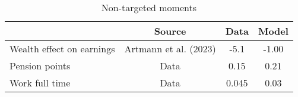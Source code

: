 \begin{table}[htbp]\caption{Non-targeted moments}\label{table:nontargeted_moments}\centering\footnotesize\begin{tabular}{lccc} \toprule  &  Source& Data & Model  \\\midrule    Wealth effect on earnings      & Artmann et al. (2023)          & -5.1 &-1.00\\ Pension points                & Data                           & 0.15 &0.21\\ Work full time              & Data                             & 0.045 &0.03\\  \bottomrule\end{tabular}\end{table}